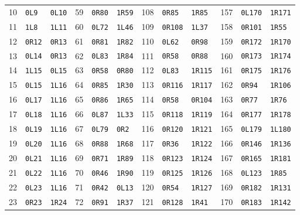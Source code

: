 \begin{center}
\begin{tabular}{rll@{\hspace{12pt}}rll@{\hspace{12pt}}rll@{\hspace{12pt}}rll}
10 & \texttt{0L9} & \texttt{0L10} & 59 & \texttt{0R80} & \texttt{1R59} & 108 & \texttt{0R85} & \texttt{1R85} & 157 & \texttt{0L170} & \texttt{1R171}\\
11 & \texttt{1L8} & \texttt{1L11} & 60 & \texttt{0L72} & \texttt{1L46} & 109 & \texttt{0R108} & \texttt{1L37} & 158 & \texttt{0R101} & \texttt{1R55}\\
12 & \texttt{0R12} & \texttt{0R13} & 61 & \texttt{0R81} & \texttt{1R82} & 110 & \texttt{0L62} & \texttt{0R98} & 159 & \texttt{0R172} & \texttt{1R170}\\
13 & \texttt{0L14} & \texttt{0R13} & 62 & \texttt{0L83} & \texttt{1R84} & 111 & \texttt{0R58} & \texttt{0R88} & 160 & \texttt{0R173} & \texttt{1R174}\\
14 & \texttt{1L15} & \texttt{0L15} & 63 & \texttt{0R58} & \texttt{0R80} & 112 & \texttt{0L83} & \texttt{1R115} & 161 & \texttt{0R175} & \texttt{1R176}\\
15 & \texttt{0L15} & \texttt{1L16} & 64 & \texttt{0R85} & \texttt{1R30} & 113 & \texttt{0R116} & \texttt{1R117} & 162 & \texttt{0R94} & \texttt{1R106}\\
16 & \texttt{0L17} & \texttt{1L16} & 65 & \texttt{0R86} & \texttt{1R65} & 114 & \texttt{0R58} & \texttt{0R104} & 163 & \texttt{0R77} & \texttt{1R76}\\
17 & \texttt{0L18} & \texttt{1L16} & 66 & \texttt{0L87} & \texttt{1L33} & 115 & \texttt{0R118} & \texttt{1R119} & 164 & \texttt{0R177} & \texttt{1R178}\\
18 & \texttt{0L19} & \texttt{1L16} & 67 & \texttt{0L79} & \texttt{0R2} & 116 & \texttt{0R120} & \texttt{1R121} & 165 & \texttt{0L179} & \texttt{1L180}\\
19 & \texttt{0L20} & \texttt{1L16} & 68 & \texttt{0R88} & \texttt{1R68} & 117 & \texttt{0R36} & \texttt{1R122} & 166 & \texttt{0R146} & \texttt{1R136}\\
20 & \texttt{0L21} & \texttt{1L16} & 69 & \texttt{0R71} & \texttt{1R89} & 118 & \texttt{0R123} & \texttt{1R124} & 167 & \texttt{0R165} & \texttt{1R181}\\
21 & \texttt{0L22} & \texttt{1L16} & 70 & \texttt{0R46} & \texttt{1R90} & 119 & \texttt{0R125} & \texttt{1R126} & 168 & \texttt{0L123} & \texttt{1R85}\\
22 & \texttt{0L23} & \texttt{1L16} & 71 & \texttt{0R42} & \texttt{0L13} & 120 & \texttt{0R54} & \texttt{1R127} & 169 & \texttt{0R182} & \texttt{1R131}\\
23 & \texttt{0R23} & \texttt{1R24} & 72 & \texttt{0R91} & \texttt{1R37} & 121 & \texttt{0R128} & \texttt{1R41} & 170 & \texttt{0R183} & \texttt{1R142}\\

\end{tabular}
\end{center}
